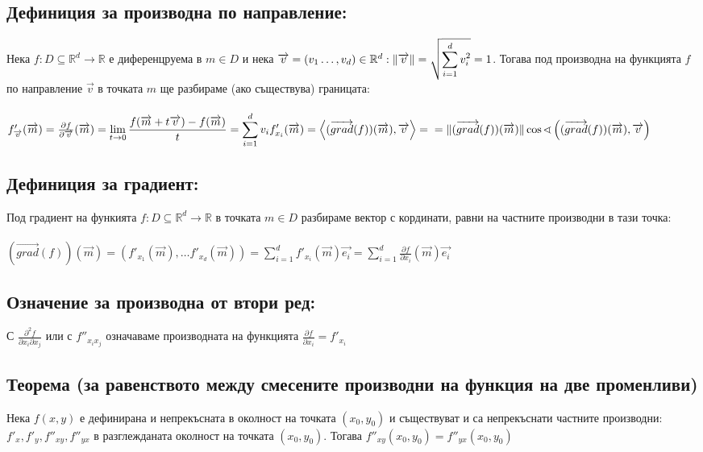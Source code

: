 \documentclass[14pt]{extarticle}
\newcommand{\R}{\mathbb{R}}
\newcommand{\Sum}{\displaystyle\sum}
\newcommand{\Lim}[2]{\displaystyle\lim_{#1 \to #2}}
\newcommand{\Vector}[1]{\overrightarrow{#1}}
\begin{document}
\subsection*{Дефиниция за производна по направление:}
Нека \(f: D \subseteq \R^d \to \R\) е диференцруема в \(m \in D \) и нека \(\Vector{v} = (v_1 \dots, v_d)  \in \R^d : \\\\
\|\Vector{v}\| = \sqrt{\Sum_{i = 1}^d v_i^2} = 1 \). Тогава под производна на функцията \(f\) по направление \(\Vector{v}\) в точката \(m\) ще разбираме (ако съществува) границата: \\\\
\(f'_{\Vector{v}}(\Vector{m}) = \frac{\partial f}{\partial \Vector{v}}(\Vector{m}) = \Lim{t}{0} \frac{f(\Vector{m} + t\Vector{v}) - f(\Vector{m})}{t} = \Sum_{i = 1}^{d}v_i f'_{x_i}(\Vector{m}) = \left\langle (\Vector{grad}(f))(\Vector{m}), \Vector{v} \right\rangle = \\\\ = \|(\Vector{grad}(f))(\Vector{m})\|\cos \sphericalangle \left((\Vector{grad}(f))(\Vector{m}), \Vector{v}\right)\)
\subsection*{Дефиниция за градиент:}
Под градиент на функията \(f: D \subseteq \R^d \to \R \) в точката \(m \in D\) разбираме вектор с кординати, равни на частните производни в тази точка: \\\\
\((\Vector{grad}(f))(\Vector{m}) = (f'_{x_1}(\Vector{m}), \dots f'_{x_d}(\Vector{m})) = \Sum_{i = 1}^d f'_{x_i}(\Vector{m}) \Vector{e_i} =
\Sum_{i = 1}^d \frac{\partial f}{\partial x_i}(\Vector{m}) \Vector{e_i}\)
\subsection*{Означение за производна от втори ред:}
С \(\frac{\partial^2f}{\partial x_i \partial x_j}\) или с \(f''_{x_ix_j}\) означаваме производната на функцията \(\frac{\partial f}{\partial x_i} = f'_{x_i}\)
\subsection*{Теорема (за равенството между смесените производни на функция на две променливи)}
Нека \(f(x,y)\) е дефинирана и непрекъсната в околност на точката \((x_0, y_0)\) и съществуват и са непрекъснати частните производни: \(f'_{x}, f'_{y}, f''_{xy}, f''_{yx}\) в разглежданата околност на точката \((x_0, y_0)\).  Тогава \(f''_{xy}(x_0, y_0) = f''_{yx}(x_0, y_0) \)
\end{document}
